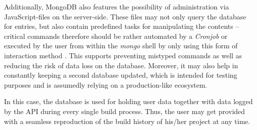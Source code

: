Additionally, MongoDB also features the possibility of administration via
JavaScript-files on the server-side. These files may not only query the database for entries, but also contain predefined tasks for manipulating the contents -- critical commands therefore should be rather automated by a \emph{Cronjob} or executed by the user from within the \emph{mongo} shell by only using this form of interaction method \cite{MongoDBWritingScripts}. This supports preventing mistyped commands as well as reducing the risk of data loss on the database. Moreover, it may also help in constantly keeping a second database updated, which is intended for testing purposes and is assumedly relying on a production-like ecosystem.

In this case, the database is used for holding user data together with data logged by the API during every single build process. Thus, the user may get provided with a seamless reproduction of the build history of his/her project at any time.


